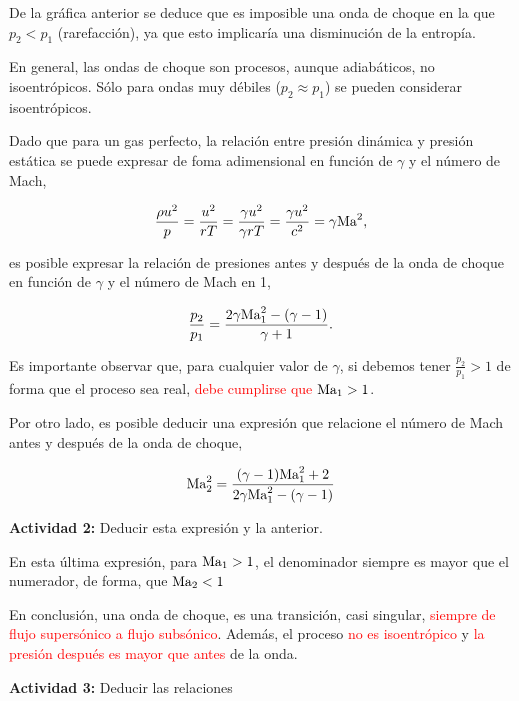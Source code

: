 	
	De la gráfica anterior se deduce que es imposible una onda de choque
	en la que $p_{2}<p_{1}$ (rarefacción), ya que esto implicaría una
	disminución de la entropía.
	
	En general, las ondas de choque son procesos, aunque adiabáticos,
	no isoentrópicos. Sólo para ondas muy débiles ($p_{2}\approx p_{1}$)
	se pueden considerar isoentrópicos.
	
	Dado que para un gas perfecto, la relación entre presión dinámica
	y presión estática se puede expresar de foma adimensional en función
	de $\gamma$ y el número de Mach, 
	
\begin{equation}
		\frac{\rho u^{2}}{p}=\frac{u^{2}}{rT}=\frac{\gamma u^{2}}{\gamma rT}=\frac{\gamma u^{2}}{c^{2}}=\gamma\text{Ma}^{2},
\end{equation}
	
	es posible expresar la relación de presiones antes y después de la
	onda de choque en función de $\gamma$ y el número de Mach en 1, 
	
\begin{equation}		\frac{p_{2}}{p_{1}}=\frac{2\gamma\text{Ma}_{1}^{2}-(\gamma-1)}{\gamma+1}.
\end{equation}
	
	

	
	Es importante observar que, para cualquier valor de $\gamma$, si
	debemos tener $\frac{p_{2}}{p_{1}}>1$ de forma que el proceso sea
	real, \textcolor{red}{debe cumplirse que $\text{Ma}_{1}>1$}.
	
	Por otro lado, es posible deducir una expresión que relacione el número
	de Mach antes y después de la onda de choque, 
	
\begin{equation}
	\text{Ma}_{2}^{2}=\frac{(\gamma-1)\text{Ma}_{1}^{2}+2}{2\gamma\text{Ma}_{1}^{2}-(\gamma-1)}
\end{equation}
	
	
	\textbf{Actividad 2:} Deducir esta expresión y la anterior.

	En esta última expresión, para $\text{Ma}_{1}>1$, el denominador siempre
	es mayor que el numerador, de forma, que $\text{Ma}_{2}<1$

	
	En conclusión, una onda de choque, es una transición, casi singular,
	\textcolor{red}{siempre de flujo supersónico a flujo subsónico}. Además,
	el proceso \textcolor{red}{no es isoentrópico} y \textcolor{red}{la
		presión después es mayor que antes} de la onda. 

	\textbf{Actividad 3:} Deducir las relaciones
		
